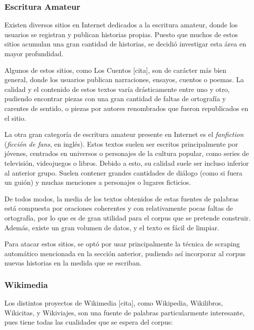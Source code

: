 \subsubsection{Escritura Amateur}

Existen diversos sitios en Internet dedicados a la escritura amateur, donde los usuarios se
registran y publican historias propias. Puesto que muchos de estos sitios acumulan una gran cantidad
de historias, se decidió investigar esta área en mayor profundidad.

Algunos de estos sitios, como Los Cuentos [cita], son de carácter más bien general, donde los
usuarios publican narraciones, ensayos, cuentos o poemas. La calidad y el contenido de estos textos
varía drásticamente entre uno y otro, pudiendo encontrar piezas con una gran cantidad de faltas de
ortografía y carentes de sentido, o piezas por autores renombrados que fueron republicados en el
sitio.

La otra gran categoría de escritura amateur presente en Internet es el \textit{fanfiction}
(\textit{ficción de fans}, en inglés). Estos textos suelen ser escritos principalmente por jóvenes,
centrados en universos o personajes de la cultura popular, como series de televisión, videojuegos o
libros. Debido a esto, su calidad suele ser incluso inferior al anterior grupo. Suelen contener
grandes cantidades de diálogo (como si fuera un guión) y muchas menciones a personajes o lugares
ficticios.

De todos modos, la media de los textos obtenidos de estas fuentes de palabras está compuesta por
oraciones coherentes y con relativamente pocas faltas de ortografía, por lo que es de gran utilidad
para el corpus que se pretende construir. Además, existe un gran volumen de datos, y el texto es
fácil de limpiar.

Para atacar estos sitios, se optó por usar principalmente la técnica de scraping automático
mencionada en la sección anterior, pudiendo así incorporar al corpus nuevas historias en la medida
que se escriban.


\subsubsection{Wikimedia}

Los distintos proyectos de Wikimedia [cita], como Wikipedia, Wikilibros, Wikicitas, y Wikiviajes,
son una fuente de palabras particularmente interesante, pues tiene todas las cualidades que se
espera del corpus:

